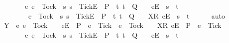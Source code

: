 \begin{isabellebody}
\ \ \ \ \ \ {\isasymunion}\ {\isacharbraceleft}e{\isachardot}\ e\ {\isasymnoteq}\ Tock\ {\isasymand}\ {\isacharparenleft}{\isasymexists}s{\isachardot}\ s\ {\isacharat}\ {\isacharbrackleft}{\isacharbrackleft}Tick{\isacharbrackright}\isactrlsub E{\isacharbrackright}\ {\isasymin}\ P\ {\isasymand}\ {\isacharparenleft}{\isasymexists}t{\isachardot}\ t\ {\isasymin}\ Q\ {\isasymand}\ {\isasymrho}\ {\isacharat}\ {\isacharbrackleft}{\isacharbrackleft}e{\isacharbrackright}\isactrlsub E{\isacharbrackright}\ {\isacharequal}\ s\ {\isacharat}\ t{\isacharparenright}{\isacharparenright}\ {\isasymor}\isanewline
\ \ \ \ \ \ \ \ e\ {\isacharequal}\ Tock\ {\isasymand}\ {\isacharparenleft}{\isasymexists}s{\isachardot}\ s\ {\isacharat}\ {\isacharbrackleft}{\isacharbrackleft}Tick{\isacharbrackright}\isactrlsub E{\isacharbrackright}\ {\isasymin}\ P\ {\isasymand}\ {\isacharparenleft}{\isasymexists}t{\isachardot}\ t\ {\isasymin}\ Q\ {\isasymand}\ {\isasymrho}\ {\isacharat}\ {\isacharbrackleft}{\isacharbrackleft}X{\isacharbrackright}\isactrlsub R{\isacharcomma}\ {\isacharbrackleft}e{\isacharbrackright}\isactrlsub E{\isacharbrackright}\ {\isacharequal}\ s\ {\isacharat}\ t{\isacharparenright}{\isacharparenright}{\isacharbraceright}{\isacharparenright}{\isachardoublequoteclose}\isanewline
\ \ \ \ \isamarkupfalse%
\ auto\isanewline
\ \ \isamarkupfalse%
\ \isamarkupfalse%
\ {\isachardoublequoteopen}Y\ {\isasyminter}\ {\isacharparenleft}{\isacharbraceleft}e{\isachardot}\ e\ {\isasymnoteq}\ Tock\ {\isasymand}\ {\isasymrho}\ {\isacharat}\ {\isacharbrackleft}{\isacharbrackleft}e{\isacharbrackright}\isactrlsub E{\isacharbrackright}\ {\isasymin}\ P\ {\isasymand}\ e\ {\isasymnoteq}\ Tick\ {\isasymor}\ e\ {\isacharequal}\ Tock\ {\isasymand}\ {\isasymrho}\ {\isacharat}\ {\isacharbrackleft}{\isacharbrackleft}X{\isacharbrackright}\isactrlsub R{\isacharcomma}\ {\isacharbrackleft}e{\isacharbrackright}\isactrlsub E{\isacharbrackright}\ {\isasymin}\ P\ {\isasymand}\ e\ {\isasymnoteq}\ Tick{\isacharbraceright}\isanewline
\ \ \ \ \ \ {\isasymunion}\ {\isacharbraceleft}e{\isachardot}\ e\ {\isasymnoteq}\ Tock\ {\isasymand}\ {\isacharparenleft}{\isasymexists}s{\isachardot}\ s\ {\isacharat}\ {\isacharbrackleft}{\isacharbrackleft}Tick{\isacharbrackright}\isactrlsub E{\isacharbrackright}\ {\isasymin}\ P\ {\isasymand}\ {\isacharparenleft}{\isasymexists}t{\isachardot}\ t\ {\isasymin}\ Q\ {\isasymand}\ {\isasymrho}\ {\isacharat}\ {\isacharbrackleft}{\isacharbrackleft}e{\isacharbrackright}\isactrlsub E{\isacharbrackright}\ {\isacharequal}\ s\ {\isacharat}\ t{\isacharparenright}{\isacharparenright}\ {\isasymor}\isanewline

\end{isabellebody}
